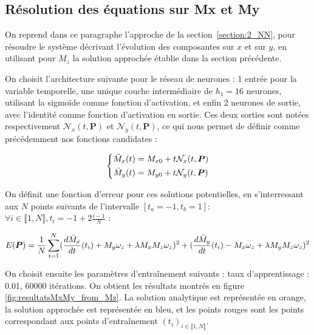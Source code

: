 \documentclass[12pt]{report}
\begin{document}
\subsection{Résolution des équations sur Mx et My}
\label{section:Mx_My_from_Mz}

On reprend dans ce paragraphe l'approche de la section~\ref{section:2_NN}, pour résoudre le système décrivant l'évolution des composantes sur $x$ et sur $y$, en utilisant pour $M_z$ la solution approchée établie dans la section précédente.

On choisit l'architecture suivante pour le réseau de neurones : 
1 entrée pour la variable temporelle, une unique couche intermédiaire de $h_1=16$ neurones, utilisant la sigmoïde comme fonction d'activation, et enfin 2 neurones de sortie, avec l'identité comme fonction d'activation en sortie.
Ces deux sorties sont notées respectivement $\mathcal{N}_x(t, \bm{P})$ et $\mathcal{N}_y(t, \bm{P})$, ce qui nous permet de définir comme précédemment nos fonctions candidates :

\begin{equation}
    \left\{
        \begin{aligned}
            \Tilde{M}_x(t) &= M_{x0} + t\mathcal{N}_x(t, \bm{P}) \\
            \Tilde{M}_y(t) &= M_{y0} + t\mathcal{N}_y(t, \bm{P})
        \end{aligned}
    \right.
\label{eq:solution_Mx_My_from M_z}
\end{equation}

On définit une fonction d'erreur pour ces solutions potentielles, en s'interressant aux $N$ points suivants de l'intervalle $[t_a=-1, t_b=1]$: 
$\forall i \in\llbracket 1,N \rrbracket, t_i = -1 + 2\frac{i-1}{N} $ :

\begin{equation}
        E(\bm{P}) = \frac{1}{N}\sum_{i=1}^{N} (\frac{d\Tilde{M}_x}{dt}(t_i) + M_y\omega_z + \lambda M_x M_z \omega_z)^2 + (\frac{d\Tilde{M}_y}{dt}(t_i) -M_x\omega_z + \lambda M_y M_z \omega_z)^2
\label{eq:erreur_Mx_My_from_Mz}
\end{equation}


On choisit ensuite les paramètres d'entraînement suivants : taux d'apprentissage : 0.01, 60000 itérations.
On obtient les résultats montrés en figure \ref{fig:resultatsMxMy_from_Mz}.
La solution analytique est représentée en orange, la solution approchée est représentée en bleu, et les points rouges sont les points correspondant aux points d'entraînement $(t_i)_{i \in \llbracket 1, N \rrbracket}$.
\end{document}
